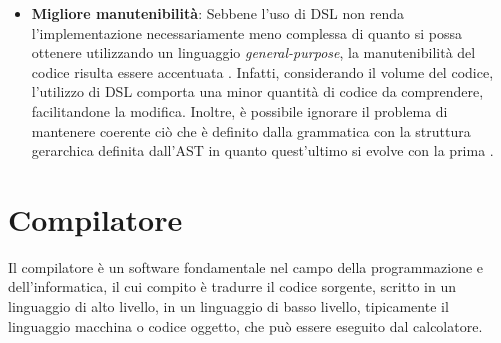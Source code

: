 \documentclass[12pt,a4paper,openright,twoside]{book}
\begin{document}
\begin{itemize}
    qualità del codice generato è chiaramente migliore [...] perché il linguaggio di modellazione è stato progettato per adattarsi 
    all'architettura del nostro terminale''\footnote{Di seguito riportata l'affermazione citata, in lingua originale:``the quality of the 
    generated code is clearly better, simply because the modelling language was designed to fit our terminal architectur''}. Inoltre, 
    l'offuscamento della reale complessità del problema, dovuto all'utilizzo di \ac{DSL}, consente ai nuovi sviluppatori di lavorare ad un 
    alto livello d'astrazione, senza dover conoscere tutti i dettagli inerenti all'implementazione del linguaggio \cite{EADS}. 
    \item \textbf{Migliore manutenibilità}: Sebbene l'uso di \ac{DSL} non renda l'implementazione necessariamente meno complessa di quanto 
    si possa ottenere utilizzando un linguaggio \textit{general-purpose}, la manutenibilità del codice risulta essere accentuata 
    \cite{Klint2010}.  Infatti, considerando il volume del codice, l'utilizzo di \ac{DSL} comporta una minor quantità di codice da comprendere, 
    facilitandone la modifica. Inoltre, è possibile  ignorare il problema di mantenere coerente ciò che è definito dalla grammatica con la 
    struttura gerarchica definita dall'\ac{AST} in quanto quest'ultimo si evolve con la prima \cite{Brabrand2010}.
\end{itemize}

\section{Compilatore}
Il compilatore è un software fondamentale nel campo della programmazione e dell’informatica, il cui compito è tradurre il codice sorgente, 
scritto in un linguaggio di alto livello, in un linguaggio di basso livello, tipicamente il linguaggio macchina o codice oggetto, che può 
essere eseguito 
dal calcolatore.
\end{document}
